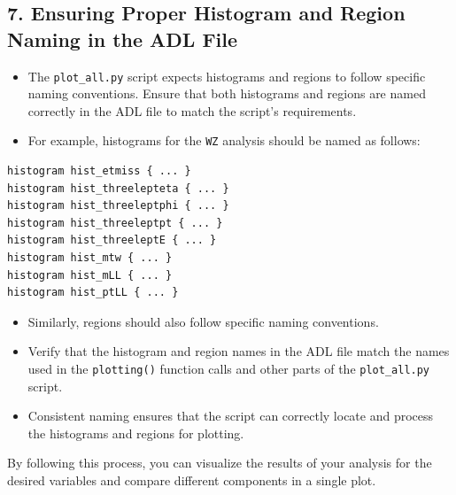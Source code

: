 \documentclass{article}
\begin{document}
\subsection*{7. Ensuring Proper Histogram and Region Naming in the ADL File}
\begin{itemize}
    \item The \texttt{plot\_all.py} script expects histograms and regions to follow specific naming conventions. Ensure that both histograms and regions are named correctly in the ADL file to match the script's requirements.
    \item For example, histograms for the \texttt{WZ} analysis should be named as follows:
\end{itemize}

\begin{lstlisting}[language=tex]
histogram hist_etmiss { ... }
histogram hist_threelepteta { ... }
histogram hist_threeleptphi { ... }
histogram hist_threeleptpt { ... }
histogram hist_threeleptE { ... }
histogram hist_mtw { ... }
histogram hist_mLL { ... }
histogram hist_ptLL { ... }
\end{lstlisting}

\begin{itemize}
    \item Similarly, regions should also follow specific naming conventions.
\end{itemize}

\begin{itemize}
    \item Verify that the histogram and region names in the ADL file match the names used in the \texttt{plotting()} function calls and other parts of the \texttt{plot\_all.py} script.
    \item Consistent naming ensures that the script can correctly locate and process the histograms and regions for plotting.
\end{itemize}

By following this process, you can visualize the results of your analysis for the desired variables and compare different components in a single plot.
\end{document}
